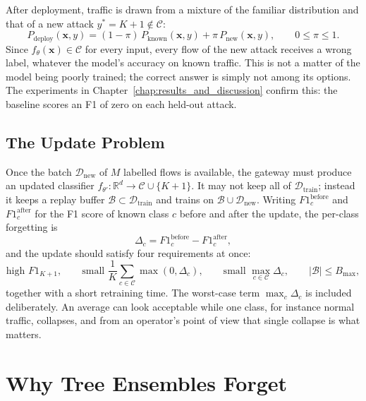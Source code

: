 After deployment, traffic is drawn from a mixture of the familiar distribution and that of a new attack $y^\ast = K+1 \notin \mathcal{C}$:
\begin{equation}
P_{\text{deploy}}(\mathbf{x}, y) = (1 - \pi)\, P_{\text{known}}(\mathbf{x}, y) + \pi\, P_{\text{new}}(\mathbf{x}, y), \qquad 0 \le \pi \le 1 .
\end{equation}
Since $f_\theta(\mathbf{x}) \in \mathcal{C}$ for every input, every flow of the new attack receives a wrong label, whatever the model's accuracy on known traffic. This is not a matter of the model being poorly trained; the correct answer is simply not among its options. The experiments in Chapter~\ref{chap:results_and_discussion} confirm this: the baseline scores an F1 of zero on each held-out attack.

\subsection{The Update Problem}
\label{subsec:update_problem}

Once the batch $\mathcal{D}_{\text{new}}$ of $M$ labelled flows is available, the gateway must produce an updated classifier $f_{\theta'} : \mathbb{R}^d \rightarrow \mathcal{C} \cup \{K+1\}$. It may not keep all of $\mathcal{D}_{\text{train}}$; instead it keeps a replay buffer $\mathcal{B} \subset \mathcal{D}_{\text{train}}$ and trains on $\mathcal{B} \cup \mathcal{D}_{\text{new}}$. Writing $F1_c^{\text{before}}$ and $F1_c^{\text{after}}$ for the F1 score of known class $c$ before and after the update, the per-class forgetting is
\begin{equation}
\Delta_c = F1_c^{\text{before}} - F1_c^{\text{after}},
\end{equation}
and the update should satisfy four requirements at once:
\begin{equation}
\text{high } F1_{K+1}, \qquad \text{small } \frac{1}{K}\sum_{c \in \mathcal{C}} \max(0, \Delta_c), \qquad \text{small } \max_{c \in \mathcal{C}} \Delta_c, \qquad |\mathcal{B}| \le B_{\max},
\end{equation}
together with a short retraining time. The worst-case term $\max_c \Delta_c$ is included deliberately. An average can look acceptable while one class, for instance normal traffic, collapses, and from an operator's point of view that single collapse is what matters.

\section{Why Tree Ensembles Forget}
\label{sec:why_forget}

